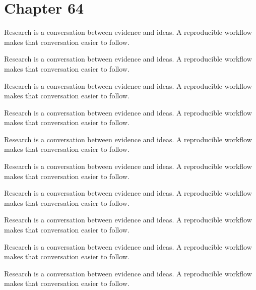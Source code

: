 \section*{Chapter 64}
Research is a conversation between evidence and ideas. A reproducible workflow makes that conversation easier to follow.

Research is a conversation between evidence and ideas. A reproducible workflow makes that conversation easier to follow.

Research is a conversation between evidence and ideas. A reproducible workflow makes that conversation easier to follow.

Research is a conversation between evidence and ideas. A reproducible workflow makes that conversation easier to follow.

Research is a conversation between evidence and ideas. A reproducible workflow makes that conversation easier to follow.

Research is a conversation between evidence and ideas. A reproducible workflow makes that conversation easier to follow.

Research is a conversation between evidence and ideas. A reproducible workflow makes that conversation easier to follow.

Research is a conversation between evidence and ideas. A reproducible workflow makes that conversation easier to follow.

Research is a conversation between evidence and ideas. A reproducible workflow makes that conversation easier to follow.

Research is a conversation between evidence and ideas. A reproducible workflow makes that conversation easier to follow.

\newpage
